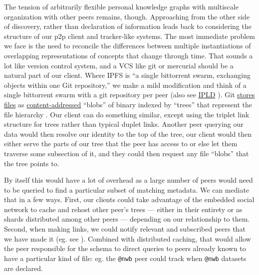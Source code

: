 The tension of arbitrarily flexible personal knowledge graphs with
multiscale organization with other peers remains, though. Approaching
from the other side of discovery, rather than declaration of information
leads back to considering the structure of our p2p client and
tracker-like systems. The most immediate problem we face is the need to
reconcile the differences between multiple instantiations of overlapping
representations of concepts that change through time. That sounds a lot
like version control system, and a VCS like git or mercurial should be a
natural part of our client. Where IPFS is ``a single bittorrent swarm,
exchanging objects within one Git repository,'' \citep{benetIPFSContentAddressed2014}  we make a mild modification and think
of a single bittorrent swarm with a git repository per peer (also see
\href{https://ipld.io/docs/}{IPLD} \citep{protocollabsIPLDDocs2021} ). Git
\href{https://git-scm.com/book/en/v2/Git-Internals-Git-Objects}{stores
files} as
\href{https://en.wikipedia.org/wiki/Content-addressable_storage}{content-addressed}
``blobs'' of binary indexed by ``trees'' that represent the file
hierarchy \citep{chaconProGit2020} . Our client can do something
similar, except using the triplet link structure for trees rather than
typical duplet links. Another peer querying our data would then resolve
our identity to the top of the tree, our client would then either serve
the parts of our tree that the peer has access to or else let them
traverse some subsection of it, and they could then request any file
``blobs'' that the tree points to.

By itself this would have a lot of overhead as a large number of peers
would need to be queried to find a particular subset of matching
metadata. We can mediate that in a few ways. First, our clients could
take advantage of the embedded social network to cache and rehost other
peer's trees --- either in their entirety or as shards distributed among
other peers --- depending on our relationship to them. Second, when
making links, we could notify relevant and subscribed peers that we have
made it (eg. see \citep{capadisliLinkedDataNotifications2017} ).
Combined with distributed caching, that would allow the peer responsible
for the schema to direct queries to peers already known to have a
particular kind of file: eg. the \texttt{@nwb} peer could track when
\texttt{@nwb} datasets are declared.

